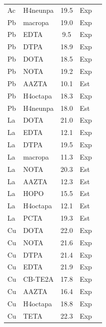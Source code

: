 \documentclass[journal=jacsat,manuscript=suppinfo]{achemso}
\begin{document}
\begin{longtable}{@{}llcp{1.5cm}c@{}}
  Ac & H4neunpa & 19.5  & Exp & \cite{Thiele2017} \\
  Pb & macropa  & 19.0  & Exp & \cite{Morgan2023} \\
  Pb & EDTA     & 9.5   & Exp & \cite{MartellSmith2004} \\
  Pb & DTPA     & 18.9  & Exp & \cite{MartellSmith2004} \\
  Pb & DOTA     & 18.5  & Exp & \cite{FerrandoCliment2022} \\
  Pb & NOTA     & 19.2  & Exp & \cite{MartellSmith2004} \\
  Pb & AAZTA    & 10.1  & Est & \cite{MartellSmith2004,Hancock1989} \\
  Pb & H4octapa & 18.3  & Exp & \cite{Morgan2023} \\
  Pb & H4neunpa & 18.0  & Est & \cite{MartellSmith2004,Hancock1989} \\
  La & DOTA     & 21.0  & Exp & \cite{MartellSmith2004} \\
  La & EDTA     & 12.1  & Exp & \cite{MartellSmith2004} \\
  La & DTPA     & 19.5  & Exp & \cite{MartellSmith2004} \\
  La & macropa  & 11.3  & Exp & \cite{Morgan2023} \\
  La & NOTA     & 20.3  & Est & \cite{MartellSmith2004,Hancock1989} \\
  La & AAZTA    & 12.3  & Est & \cite{MartellSmith2004,Hancock1989} \\
  La & HOPO     & 15.5  & Est & \cite{MartellSmith2004,Hancock1989} \\
  La & H4octapa & 12.1  & Est & \cite{MartellSmith2004,Hancock1989} \\
  La & PCTA     & 19.3  & Est & \cite{MartellSmith2004,Hancock1989} \\
  Cu & DOTA     & 22.0  & Exp & \cite{MartellSmith2004} \\
  Cu & NOTA     & 21.6  & Exp & \cite{MartellSmith2004} \\
  Cu & DTPA     & 21.4  & Exp & \cite{MartellSmith2004} \\
  Cu & EDTA     & 21.9  & Exp & \cite{MartellSmith2004} \\
  Cu & CB-TE2A  & 17.8  & Exp & \cite{MartellSmith2004} \\
  Cu & AAZTA    & 16.4  & Exp & \cite{MartellSmith2004} \\
  Cu & H4octapa & 18.8  & Exp & \cite{Morgan2023} \\
  Cu & TETA     & 22.3  & Exp & \cite{MartellSmith2004} \\

\end{longtable}
\end{document}
